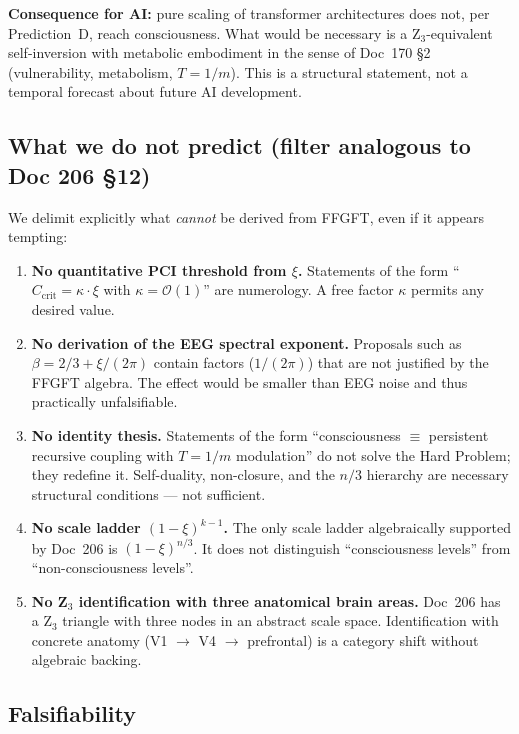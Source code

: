 \textbf{Consequence for AI:} pure scaling of transformer architectures does not, per Prediction~D, reach consciousness. What would be necessary is a Z$_3$-equivalent self-inversion with metabolic embodiment in the sense of Doc~170 \S2 (vulnerability, metabolism, $T = 1/m$). This is a structural statement, not a temporal forecast about future AI development.

\subsection{What we do not predict (filter analogous to Doc 206 \S12)}\label{sec:predictions_filter}

We delimit explicitly what \emph{cannot} be derived from FFGFT, even if it appears tempting:

\begin{enumerate}
\item \textbf{No quantitative PCI threshold from $\xi$.} Statements of the form ``$C_{\text{crit}} = \kappa \cdot \xi$ with $\kappa = \mathcal{O}(1)$'' are numerology. A free factor $\kappa$ permits any desired value.
\item \textbf{No derivation of the EEG spectral exponent.} Proposals such as $\beta = 2/3 + \xi/(2\pi)$ contain factors ($1/(2\pi)$) that are not justified by the FFGFT algebra. The effect would be smaller than EEG noise and thus practically unfalsifiable.
\item \textbf{No identity thesis.} Statements of the form ``consciousness $\equiv$ persistent recursive coupling with $T = 1/m$ modulation'' do not solve the Hard Problem; they redefine it. Self-duality, non-closure, and the $n/3$ hierarchy are necessary structural conditions --- not sufficient.
\item \textbf{No scale ladder $(1-\xi)^{k-1}$.} The only scale ladder algebraically supported by Doc~206 is $(1-\xi)^{n/3}$. It does not distinguish ``consciousness levels'' from ``non-consciousness levels''.
\item \textbf{No Z$_3$ identification with three anatomical brain areas.} Doc~206 has a Z$_3$ triangle with three nodes in an abstract scale space. Identification with concrete anatomy (V1 $\to$ V4 $\to$ prefrontal) is a category shift without algebraic backing.
\end{enumerate}

\subsection{Falsifiability}\label{sec:predictions_falsification}

